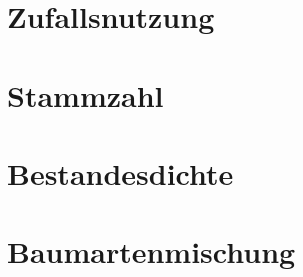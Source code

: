 \documentclass[twocolumn]{scrartcl}
\begin{document}
\section{Zufallsnutzung}

\section{Stammzahl}
\section{Bestandesdichte}

\section{Baumartenmischung}



\end{document}
